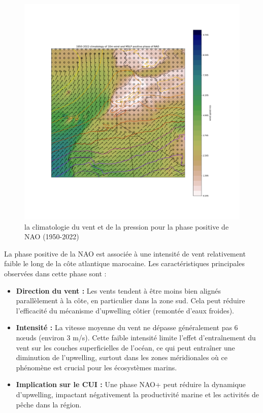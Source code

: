 \begin{figure}[H]
\centering
\includegraphics[scale=0.3]{POS_PHASE.png}
\caption{la climatologie du vent et de la pression pour la phase positive de NAO (1950-2022)}
\end{figure}


La phase positive de la NAO est associée à une intensité de vent relativement faible le long de la côte atlantique marocaine. Les caractéristiques principales observées dans cette phase sont :
\begin{itemize}
	\item \textbf {Direction du vent :} Les vents tendent à être moins bien alignés parallèlement à la côte, en particulier dans la zone sud. Cela peut réduire l’efficacité du mécanisme d’upwelling côtier (remontée d’eaux froides).
	\item \textbf{Intensité :} La vitesse moyenne du vent ne dépasse généralement pas 6 nœuds (environ 3 m/s). Cette faible intensité limite l’effet d’entraînement du vent sur les couches superficielles de l’océan, ce qui peut entraîner une diminution de l’upwelling, surtout dans les zones méridionales où ce phénomène est crucial pour les écosystèmes marins.
	\item \textbf{Implication sur le CUI :} Une phase NAO+ peut réduire la dynamique d’upwelling, impactant négativement la productivité marine et les activités de pêche dans la région.
\end{itemize}




